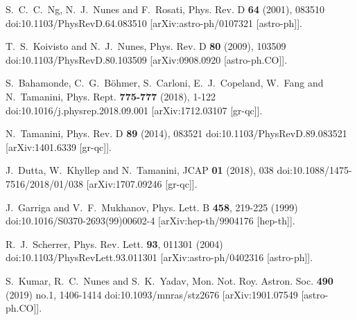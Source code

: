 \documentclass[a4paper,12pt]{article}
\begin{document}
\begin{thebibliography}{99}
S.~C.~C.~Ng, N.~J.~Nunes and F.~Rosati,
Phys. Rev. D \textbf{64} (2001), 083510
doi:10.1103/PhysRevD.64.083510
[arXiv:astro-ph/0107321 [astro-ph]].
		
T.~S.~Koivisto and N.~J.~Nunes,
Phys. Rev. D \textbf{80} (2009), 103509
doi:10.1103/PhysRevD.80.103509
[arXiv:0908.0920 [astro-ph.CO]].
		
S.~Bahamonde, C.~G.~B\"ohmer, S.~Carloni, E.~J.~Copeland, W.~Fang and N.~Tamanini,
Phys. Rept. \textbf{775-777} (2018), 1-122
doi:10.1016/j.physrep.2018.09.001
[arXiv:1712.03107 [gr-qc]].
		
N.~Tamanini,
Phys. Rev. D \textbf{89} (2014), 083521
doi:10.1103/PhysRevD.89.083521
[arXiv:1401.6339 [gr-qc]].
		
J.~Dutta, W.~Khyllep and N.~Tamanini,
JCAP \textbf{01} (2018), 038
doi:10.1088/1475-7516/2018/01/038
[arXiv:1707.09246 [gr-qc]].

J.~Garriga and V.~F.~Mukhanov,
Phys. Lett. B \textbf{458}, 219-225 (1999)
doi:10.1016/S0370-2693(99)00602-4
[arXiv:hep-th/9904176 [hep-th]].

R.~J.~Scherrer,
Phys. Rev. Lett. \textbf{93}, 011301 (2004)
doi:10.1103/PhysRevLett.93.011301
[arXiv:astro-ph/0402316 [astro-ph]].

S.~Kumar, R.~C.~Nunes and S.~K.~Yadav,
Mon. Not. Roy. Astron. Soc. \textbf{490} (2019) no.1, 1406-1414
doi:10.1093/mnras/stz2676
[arXiv:1901.07549 [astro-ph.CO]].


\end{thebibliography}
\end{document}
